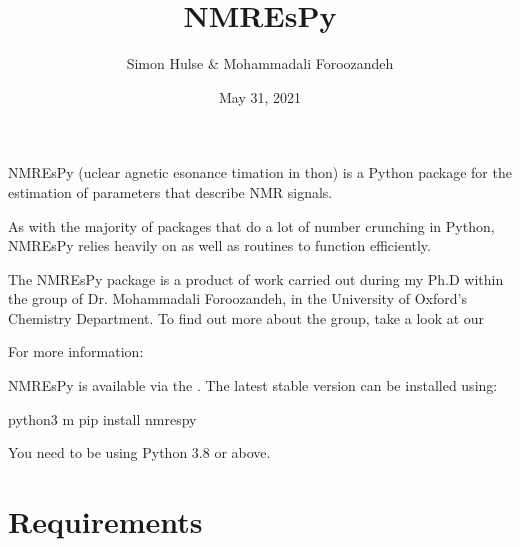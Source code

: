 \documentclass[letterpaper,10pt,english]{sphinxmanual}
\title{NMR\sphinxhyphen{}EsPy}
\date{May 31, 2021}
\author{Simon Hulse \& Mohammadali Foroozandeh}
\begin{document}
\pagestyle{empty}
\sphinxmaketitle
\pagestyle{plain}
\sphinxtableofcontents
\pagestyle{normal}
\label{\detokenize{index::doc}}




\sphinxAtStartPar
NMR\sphinxhyphen{}EsPy (uclear agnetic esonance timation in
thon) is a Python package for the estimation of parameters that
describe NMR signals.

\sphinxAtStartPar
As with the majority of packages that do a lot of number crunching in Python,
NMR\sphinxhyphen{}EsPy relies heavily on  as well as
 routines to function efficiently.

\sphinxAtStartPar
The NMR\sphinxhyphen{}EsPy package is a product of work carried out during my Ph.D
within the group of Dr. Mohammadali Foroozandeh, in the University of
Oxford’s Chemistry Department. To find out more about the group, take a look
at our 

\sphinxAtStartPar
For more information:

\sphinxAtStartPar
{} 

\sphinxAtStartPar
{} 





\sphinxAtStartPar
NMR\sphinxhyphen{}EsPy is available via the
. The latest stable
version can be installed using:

\begin{sphinxVerbatim}[commandchars=\\\{\}]
\PYGZdl{} python3 \PYGZhy{}m pip install nmrespy
\end{sphinxVerbatim}

\sphinxAtStartPar
You need to be using Python 3.8 or above.


\chapter{Requirements}
\label{\detokenize{install:requirements}}
\end{document}
